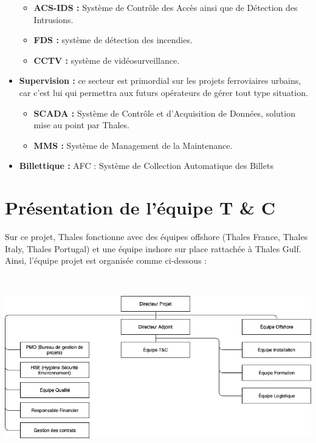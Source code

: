 \begin{itemize}
\begin{itemize}
\item \textbf{\gls{ACS-IDS} :} Système de Contrôle des Accès ainsi que de Détection des Intrusions.
\item \textbf{\gls{FDS} :} système de détection des incendies.
\item \textbf{\gls{CCTV} :} système de vidéosurveillance.
\end{itemize}
\item \textbf{Supervision :} ce secteur est primordial sur les projets ferroviaires urbains, car c'est lui qui permettra aux futurs opérateurs de gérer tout type situation.
\begin{itemize}
\item \textbf{\gls{SCADA} :} Système de Contrôle et d'Acquisition de Données, solution mise au point par Thales.
\item \textbf{\gls{MMS} :} Système de Management de la Maintenance.
\end{itemize}
\item \textbf{Billettique :} \gls{AFC} : Système de Collection Automatique des Billets
\end{itemize}


\section{Présentation de l'équipe T \& C}

Sur ce projet, Thales fonctionne avec des équipes offshore (Thales France, Thales Italy, Thales Portugal) et une équipe inshore sur place rattachée à Thales Gulf.
Ainsi, l'équipe projet est organisée comme ci-dessous :

\begin{center}
\includegraphics[height=8cm]{ressources/images/figures/OBS1.png}
\end{center}

